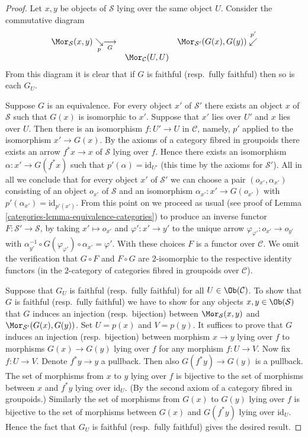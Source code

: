 \begin{proof}

Let $x, y$ be objects of $\mathcal{S}$ lying over the same object $U$.
Consider the commutative diagram
$$
\begin{array}{ccc}\Mor_\mathcal{S}(x, y) \underset{p}{\searrow}\underset{G}{\longrightarrow} &  & \Mor_{\mathcal{S}'}(G(x), G(y)) \overset{p'}{\swarrow} \\  & \Mor_\mathcal{C}(U, U) & \end{array}
$$
From this diagram it is clear that if $G$ is faithful (resp.\ fully faithful)
then so is each $G_U$.

\medskip\noindent
Suppose $G$ is an equivalence. For every object
$x'$ of $\mathcal{S}'$ there exists an object $x$ of $\mathcal{S}$
such that $G(x)$ is isomorphic to $x'$. Suppose that $x'$ lies
over $U'$ and $x$ lies over $U$. Then there is an isomorphism
$f : U' \to U$ in $\mathcal{C}$, namely, $p'$ applied to the
isomorphism $x' \to G(x)$. By the axioms of a category fibred
in groupoids there exists an arrow $f^*x \to x$ of $\mathcal{S}$
lying over $f$. Hence there exists an isomorphism
$\alpha : x' \to G(f^*x)$ such that $p'(\alpha) = \text{id}_{U'}$
(this time by the axioms for $\mathcal{S}'$). All in all we conclude
that for every object $x'$ of $\mathcal{S}'$ we can choose
a pair $(o_{x'}, \alpha_{x'})$ consisting of an object
$o_{x'}$ of $\mathcal{S}$ and an isomorphism $\alpha_{x'} : x' \to G(o_{x'})$
with $p'(\alpha_{x'}) = \text{id}_{p'(x')}$.
From this point on we proceed as usual (see proof of
Lemma \ref{categories-lemma-equivalence-categories}) to produce an inverse
functor $F : \mathcal{S}' \to \mathcal{S}$, by taking
$x' \mapsto o_{x'}$ and $\varphi' : x' \to y'$ to the unique
arrow $\varphi_{\varphi'} : o_{x'} \to o_{y'}$ with
$\alpha_{y'}^{-1} \circ G(\varphi_{\varphi'}) \circ \alpha_{x'} = \varphi'$.
With these choices $F$ is a functor over $\mathcal{C}$.
We omit the verification that $G \circ F$ and $F \circ G$ are
$2$-isomorphic to the respective identity functors
(in the $2$-category of categories fibred in groupoids over $\mathcal{C}$).

\medskip\noindent
Suppose that $G_U$ is faithful (resp.\ fully faithful)
for all $U\in\Ob(\mathcal C)$. To
show that $G$ is faithful (resp.\ fully faithful)
we have to show for any objects
$x, y\in\Ob(\mathcal{S})$ that $G$ induces an
injection (resp.\ bijection) between
$\Mor_\mathcal{S}(x, y)$ and
$\Mor_{\mathcal{S}'}(G(x), G(y))$.
Set $U = p(x)$ and $V = p(y)$.
It suffices to prove that $G$
induces an injection (resp.\ bijection) between morphism
$x \to y$ lying over $f$ to morphisms $G(x) \to G(y)$ lying over $f$
for any morphism $f : U \to V$.
Now fix $f : U \to V$. Denote $f^*y \to y$ a pullback.
Then also $G(f^*y) \to G(y)$ is a pullback.
The set of morphisms from $x$ to $y$ lying over $f$
is bijective to the set of morphisms between
$x$ and $f^*y$ lying over $\text{id}_U$. (By the second axiom
of a category fibred in groupoids.) Similarly
the set of morphisms from $G(x)$ to $G(y)$ lying over $f$
is bijective to the set of morphisms between
$G(x)$ and $G(f^*y)$ lying over $\text{id}_U$.
Hence the fact that $G_U$ is faithful (resp.\ fully faithful)
gives the desired result.


\end{proof}
